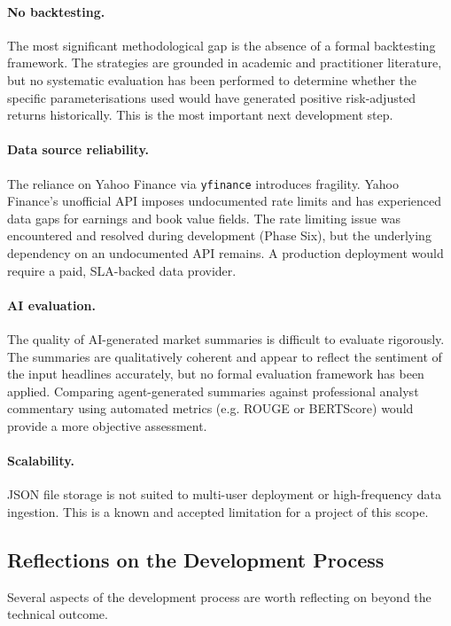 \documentclass[12pt,a4paper]{article}
\begin{document}
\paragraph{No backtesting.} The most significant methodological gap is the absence of a formal backtesting framework. The strategies are grounded in academic and practitioner literature, but no systematic evaluation has been performed to determine whether the specific parameterisations used would have generated positive risk-adjusted returns historically. This is the most important next development step.

\paragraph{Data source reliability.} The reliance on Yahoo Finance via \texttt{yfinance} introduces fragility. Yahoo Finance's unofficial API imposes undocumented rate limits and has experienced data gaps for earnings and book value fields. The rate limiting issue was encountered and resolved during development (Phase Six), but the underlying dependency on an undocumented API remains. A production deployment would require a paid, SLA-backed data provider.

\paragraph{AI evaluation.} The quality of AI-generated market summaries is difficult to evaluate rigorously. The summaries are qualitatively coherent and appear to reflect the sentiment of the input headlines accurately, but no formal evaluation framework has been applied. Comparing agent-generated summaries against professional analyst commentary using automated metrics (e.g. ROUGE or BERTScore) would provide a more objective assessment.

\paragraph{Scalability.} JSON file storage is not suited to multi-user deployment or high-frequency data ingestion. This is a known and accepted limitation for a project of this scope.

\subsection{Reflections on the Development Process}

Several aspects of the development process are worth reflecting on beyond the technical outcome.
\end{document}
